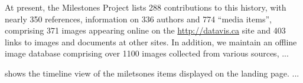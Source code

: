 At present, the Milestones Project lists 288 contributions to this history, with nearly 350 references,
information on 336 authors and 774 ``media items'', comprising 371 images appearing online on the
\url{http://datavis.ca} site and 403 links to images and documents at other sites.
In addition, we maintain an offline image database comprising over 1100 images collected from
various sources, ...

 shows the timeline view of the miletsones items displayed on the
landing page. ...

